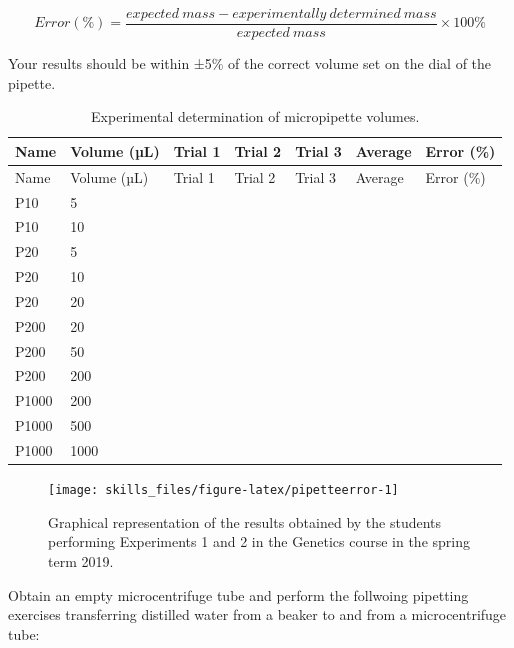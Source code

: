 \documentclass[]{book}
\begin{document}
\[ Error (\%) = \frac{expected\ mass - experimentally\ determined\ mass}{expected\ mass} \times 100\% \]

Your results should be within ±5\% of the correct volume set on the dial
of the pipette.

\begin{longtable}[]{@{}lllllll@{}}
\caption{\label{tab:micro} Experimental determination of micropipette
volumes.}\tabularnewline
\toprule
Name & Volume (µL) & Trial 1 & Trial 2 & Trial 3 & Average & Error
(\%)\tabularnewline
\midrule
\endfirsthead
\toprule
Name & Volume (µL) & Trial 1 & Trial 2 & Trial 3 & Average & Error
(\%)\tabularnewline
\midrule
\endhead
P10 & 5 & & & & &\tabularnewline
P10 & 10 & & & & &\tabularnewline
P20 & 5 & & & & &\tabularnewline
P20 & 10 & & & & &\tabularnewline
P20 & 20 & & & & &\tabularnewline
P200 & 20 & & & & &\tabularnewline
P200 & 50 & & & & &\tabularnewline
P200 & 200 & & & & &\tabularnewline
P1000 & 200 & & & & &\tabularnewline
P1000 & 500 & & & & &\tabularnewline
P1000 & 1000 & & & & &\tabularnewline
\bottomrule
\end{longtable}





\begin{figure}

{\centering \texttt{[image: skills\_files/figure-latex/pipetteerror-1]} 

}

\caption{Graphical representation of the results obtained by
the students performing Experiments 1 and 2 in the Genetics course in
the spring term 2019.}\label{fig:pipetteerror}
\end{figure}

Obtain an empty microcentrifuge tube and perform the follwoing pipetting
exercises transferring distilled water from a beaker to and from a
microcentrifuge tube:
\end{document}
